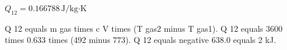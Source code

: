 \( Q_{12} = 0.166788 \, \text{J/kg·K} \)

Q 12 equals m gas times c V times (T gas2 minus T gas1).  
Q 12 equals 3600 times 0.633 times (492 minus 773).  
Q 12 equals negative 638.0 equals 2 kJ.